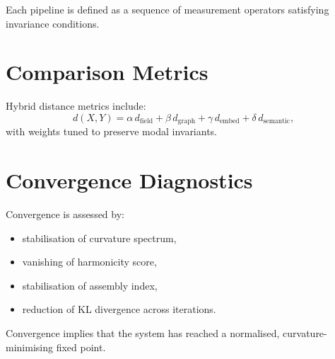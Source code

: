 Each pipeline is defined as a sequence of measurement operators satisfying invariance conditions.

\section{Comparison Metrics}

Hybrid distance metrics include:
\[
d(X,Y) = \alpha\, d_{\mathrm{field}} + 
         \beta\, d_{\mathrm{graph}} +
         \gamma\, d_{\mathrm{embed}} +
         \delta\, d_{\mathrm{semantic}},
\]
with weights tuned to preserve modal invariants.

\section{Convergence Diagnostics}

Convergence is assessed by:
\begin{itemize}
\item stabilisation of curvature spectrum,
\item vanishing of harmonicity score,
\item stabilisation of assembly index,
\item reduction of KL divergence across iterations.
\end{itemize}

Convergence implies that the system has reached a normalised, curvature-minimising fixed point.


